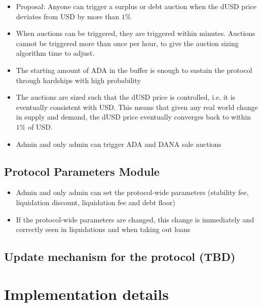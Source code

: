 \documentclass{article} %
\begin{document}
\begin{itemize}
  \item Proposal: Anyone can trigger a surplus or debt auction when the dUSD
    price deviates from USD by more than $1\%$
  \item When auctions can be triggered, they are triggered within minutes.
    Auctions cannot be triggered more than once per hour, to give the auction
    sizing algorithm time to adjust.
  \item The starting amount of ADA in the buffer is enough to sustain the
    protocol through hardships with high probability
  \item The auctions are sized such that the dUSD price is controlled, i.e. it
    is eventually consistent with USD.
    This means that given any real world change in supply and demand, the dUSD
    price eventually converges back to within $1\%$ of USD.
  \item Admin and only admin can trigger ADA and DANA sale auctions
\end{itemize}

\subsection{Protocol Parameters Module}
\begin{itemize}
  \item Admin and only admin can set the protocol-wide parameters (stability
    fee, liquidation discount, liquidation fee and debt
    floor)
  \item If the protocol-wide parameters are changed, this change is immediately
    and correctly seen in liquidations and when taking out loans
\end{itemize}

\subsection{Update mechanism for the protocol (TBD)}

\section{Implementation details}
\end{document}
